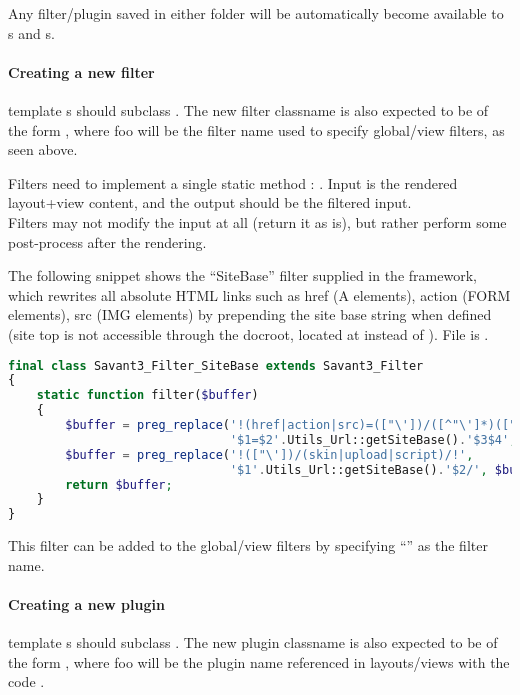 \documentclass[pdftex,12pt,a4paper]{article}
\begin{document}
Any filter/plugin saved in either folder will be automatically become available to s and s.\\

\paragraph{Creating a new filter}

 template s should subclass . The new filter classname is also expected to be of the form , where foo will be the filter name used to specify global/view filters, as seen above.

Filters need to implement a single static method : . Input is the rendered layout+view content, and the output should be the filtered input.\\
Filters may not modify the input at all (\ie return it as is), but rather perform some post-process after the rendering.

The following snippet shows the ``SiteBase'' filter supplied in the framework, which rewrites all absolute HTML links such as href (A elements), action (FORM elements), src (IMG elements) by prepending the site base string when defined (\ie site top is not accessible through the docroot, \eg located at  instead of ). File is .
\begin{lstlisting}[label="filter-sitebase",caption="siteBase filter",language=PHP]
final class Savant3_Filter_SiteBase extends Savant3_Filter
{
    static function filter($buffer)
    {
        $buffer = preg_replace('!(href|action|src)=(["\'])/([^"\']*)(["\'])!',
							   '$1=$2'.Utils_Url::getSiteBase().'$3$4', $buffer);
        $buffer = preg_replace('!(["\'])/(skin|upload|script)/!',
							   '$1'.Utils_Url::getSiteBase().'$2/', $buffer);
        return $buffer;
    }
}
\end{lstlisting}
This filter can be added to the global/view filters by specifying ``'' as the filter name.

\paragraph{Creating a new plugin}

 template s should subclass . The new plugin classname is also expected to be of the form , where foo will be the plugin name referenced in layouts/views with the code .
\end{document}
